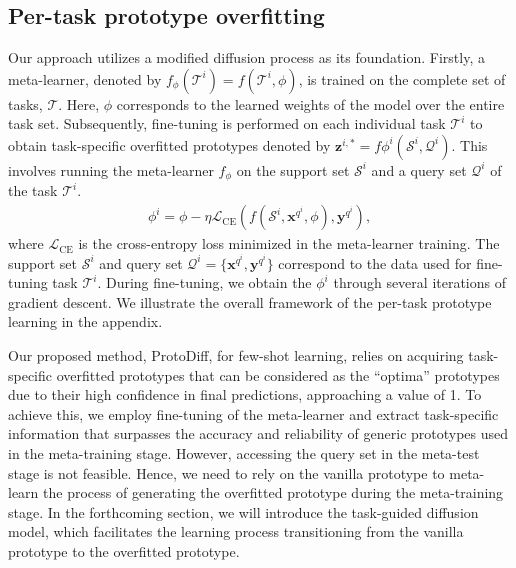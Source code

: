 \subsection{Per-task prototype overfitting}
\label{sec:overfit}



Our approach utilizes a modified diffusion process as its foundation. Firstly, a meta-learner, denoted by $f_{\phi}(\mathcal{T}^i) {=} f(\mathcal{T}^i, \phi)$, is trained on the complete set of tasks, $\mathcal{T}$. Here, $\phi$ corresponds to the learned weights of the model over the entire task set.
Subsequently, fine-tuning is performed on each individual task $\mathcal{T}^i$ to obtain task-specific overfitted prototypes denoted by $\mathbf{z}^{i, *} {=} f{{\phi}^i}(\mathcal{S}^i, \mathcal{Q}^i)$. This involves running the meta-learner $f_{\phi}$ on the support set $\mathcal{S}^i$ and a query set $\mathcal{Q}^i$ of the task $\mathcal{T}^i$.
\begin{align}
\phi^{i} = \phi - \eta \mathcal{L}_{\mathrm{CE}}(f(\mathcal{S}^i, \mathbf{x}^{q^i}, \phi), \mathbf{y}^{q^i}),
\end{align}
where $\mathcal{L}_{\mathrm{CE}}$ is the cross-entropy loss  minimized in the meta-learner training.  The support set $\mathcal{S}^i$ and query set $\mathcal{Q}^i {=} \{\mathbf{x}^{q^i}, \mathbf{y}^{q^i}\}$ correspond to the data used for fine-tuning task $\mathcal{T}^i$. During fine-tuning, we obtain the $\phi^i$ through several iterations of gradient descent. We illustrate the overall framework of the per-task  prototype learning in the appendix.

Our proposed method, ProtoDiff, for few-shot learning, relies on acquiring task-specific overfitted prototypes that can be considered as the  ``optima'' prototypes due to their high confidence in final predictions, approaching a value of 1. To achieve this, we employ fine-tuning of the meta-learner and extract task-specific information that surpasses the accuracy and reliability of generic prototypes used in the meta-training stage.
However, accessing the query set in the meta-test stage is not feasible. Hence, we need to rely on the vanilla prototype to meta-learn the process of generating the overfitted prototype during the meta-training stage. In the forthcoming section, we will introduce the task-guided diffusion model, which facilitates the learning process transitioning from the vanilla prototype to the overfitted prototype.

